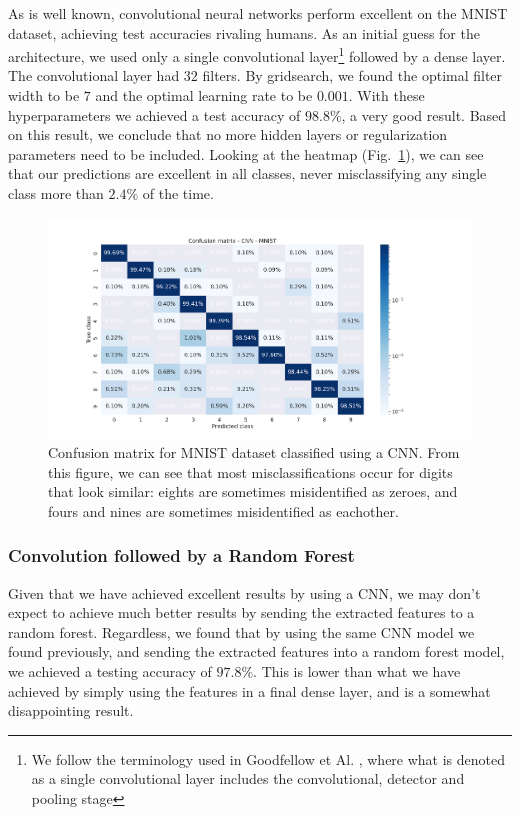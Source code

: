 \documentclass[onecolumn,10pt,cleanfoot]{asme2ej}
\begin{document}
As is well known, convolutional neural networks perform excellent on the MNIST dataset, achieving test accuracies rivaling humans. As an initial guess for the architecture, we used only a single convolutional layer\footnote{We follow the terminology used in Goodfellow et Al. \cite[336]{gbc}, where what is denoted as a single convolutional layer includes the convolutional, detector and pooling stage} followed by a dense layer. The convolutional layer had $32$ filters. By gridsearch, we found the optimal filter width to be $7$ and the optimal learning rate to be $0.001$. With these hyperparameters we achieved a test accuracy of $98.8\%$, a very good result. Based on this result, we conclude that no more hidden layers or regularization parameters need to be included. Looking at the heatmap (Fig.~\ref{mnistheatmap_cnn}), we can see that our predictions are excellent in all classes, never misclassifying any single class more than $2.4\%$ of the time.

\begin{figure}[H]
\centerline{\includegraphics[width=8in]{figure/conf_cnn_MNIST.png}}
\caption{Confusion matrix for MNIST dataset classified using a CNN. From this figure, we can see that most misclassifications occur for digits that look similar: eights are sometimes misidentified as zeroes, and fours and nines are sometimes misidentified as eachother.}
\label{mnistheatmap_cnn}
\end{figure}

\subsubsection{Convolution followed by a Random Forest}

Given that we have achieved excellent results by using a CNN, we may don't expect to achieve much better results by sending the extracted features to a random forest. Regardless, we found that by using the same CNN model we found previously, and sending the extracted features into a random forest model, we achieved a testing accuracy of $97.8\%$. This is lower than what we have achieved by simply using the features in a final dense layer, and is a somewhat disappointing result.
\end{document}
